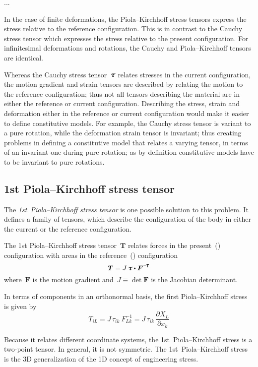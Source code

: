 ...


{\small
In the case of finite deformations, the Piola\hbox{--}Kirchhoff stress tensors express the stress relative to the reference configuration. This is in contrast to the Cauchy stress tensor which expresses the stress relative to the present configuration. For infinitesimal deformations and rotations, the Cauchy and Piola\hbox{--}Kirchhoff tensors are identical.

Whereas the Cauchy stress tensor~${\cauchystress}$ relates stresses in the current configuration, the motion gradient and strain tensors are described by relating the motion to the reference configuration; thus not all tensors describing the material are in either the reference or current configuration. Describing the stress, strain and deformation either in the reference or current configuration would make it easier to define constitutive models. For example, the Cauchy stress tensor is variant to a pure rotation, while the deformation strain tensor is invariant; thus creating problems in defining a constitutive model that relates a varying tensor, in terms of an invariant one during pure rotation; as by definition constitutive models have to be invariant to pure rotations.

\subsection*{1st Piola\hbox{--}Kirchhoff stress tensor}

The \emph{1st~Piola\hbox{--}Kirchhoff stress tensor} is one possible solution to this problem. It defines a family of tensors, which describe the configuration of the body in either the current or the reference configuration.

The 1st Piola\hbox{--}Kirchhoff stress tensor~$\bm{T}$ relates forces in the present~() configuration with areas in the reference~() configuration
\[
\bm{T} = J \, \cauchystress \dotp \bm{F}^{\expminusT}
\]
where~$\bm{F}$ is the motion gradient and~${J \equiv \operatorname{det} \bm{F}}$ is the Jacobian determinant.

In terms of components in an orthonormal basis, the first Piola\hbox{--}Kirchhoff stress is given by
\[
T_{iL} = J \, \tau_{ik}~F_{Lk}^{-1} = J \, \tau_{ik} \, \frac{\partial X_{L}}{\partial x_{k}}
\]

Because it relates different coordinate systems, the 1st~Piola\hbox{--}Kirchhoff stress is a two-point tensor. In general, it is not symmetric. The 1st~Piola\hbox{--}Kirchhoff stress is the 3D generalization of the 1D concept of engineering stress.

}
